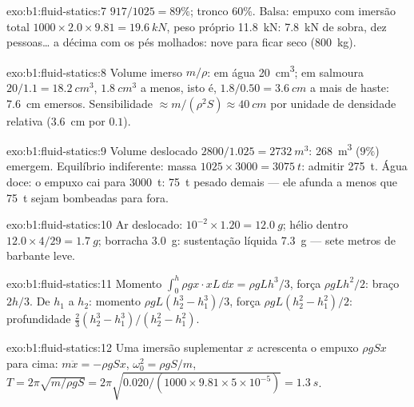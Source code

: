 \begin{solution}{exo:b1:fluid-statics:7}
$917/1025 = 89\%$; tronco $60\%$. Balsa: empuxo com imersão total $1000 \times
2.0 \times 9.81 = \qty{19.6}{kN}$, peso próprio \qty{11.8}{kN}: \qty{7.8}{kN}
de sobra, dez pessoas\dots{} a décima com os pés molhados: nove para ficar
seco (\qty{800}{kg}).
\end{solution}

\begin{solution}{exo:b1:fluid-statics:8}
Volume imerso $m/\rho$: em água \qty{20}{cm^3}; em salmoura $20/1.1 = \qty{18.2}{cm^3}$,
$\qty{1.8}{cm^3}$ a menos, isto é, $1.8/0.50 = \qty{3.6}{cm}$ a mais de haste: \qty{7.6}{cm}
emersos. Sensibilidade $\approx m/(\rho^2S) \approx \qty{40}{cm}$ por unidade de densidade
relativa (\qty{3.6}{cm} por $0.1$).
\end{solution}

\begin{solution}{exo:b1:fluid-statics:9}
Volume deslocado $2800/1.025 = \qty{2732}{m^3}$: \qty{268}{m^3} ($9\%$)
emergem. Equilíbrio indiferente: massa $1025 \times 3000 = \qty{3075}{t}$: admitir \qty{275}{t}.
Água doce: o empuxo cai para \qty{3000}{t}: \qty{75}{t} pesado demais --- ele afunda
a menos que \qty{75}{t} sejam bombeadas para fora.
\end{solution}

\begin{solution}{exo:b1:fluid-statics:10}
Ar deslocado: $10^{-2} \times 1.20 = \qty{12.0}{g}$; hélio dentro $12.0 \times
4/29 = \qty{1.7}{g}$; borracha \qty{3.0}{g}: sustentação líquida \qty{7.3}{g} --- sete metros
de barbante leve.
\end{solution}

\begin{solution}{exo:b1:fluid-statics:11}
Momento $\int_0^h\rho gx\cdot xL\,\dd x = \rho gLh^3/3$, força $\rho gLh^2/2$:
braço $2h/3$. De $h_1$ a $h_2$: momento $\rho gL(h_2^3 - h_1^3)/3$, força
$\rho gL(h_2^2 - h_1^2)/2$: profundidade $\frac23(h_2^3 - h_1^3)/(h_2^2 - h_1^2)$.
\end{solution}

\begin{solution}{exo:b1:fluid-statics:12}
Uma imersão suplementar $x$ acrescenta o empuxo $\rho gSx$ para cima: $m\ddot x = -\rho gSx$,
$\omega_0^2 = \rho gS/m$, $T = 2\pi\sqrt{m/\rho gS} = 2\pi\sqrt{0.020/(1000 \times
9.81 \times 5\times10^{-5})} = \qty{1.3}{s}$.
\end{solution}

